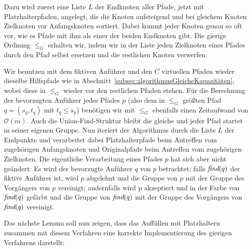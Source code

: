 Dazu wird zuerst eine Liste $L$ der Endknoten aller Pfade, jetzt mit Platzhalterpfaden, angelegt, die die Knoten
aufsteigend und bei gleichem Knoten Zielknoten vor Anfangsknoten sortiert.
Dabei kommt jeder Knoten genau so oft vor, wie es Pfade mit ihm als einer der beiden Endknoten gibt.
Die gierige Ordnung $\leq_{G}$ erhalten wir, indem wir in der Liste jeden Zielknoten eines Pfades durch den Pfad selbst
ersetzen und die restlichen Knoten verwerfen.

Wir benutzen mit dem fiktiven Anführer und den $C$ virtuellen Pfaden wieder dieselbe Hilfspfade wie in
Abschnitt~\ref{subsec:algorithmusGleicheKapazitäten}, wobei diese in $\leq_G$ wieder vor den restlichen Pfaden stehen.
Für die Berechnung der bevorzugten Anführer jedes Pfades $p$ (also dem in $\leq_G$ größten Pfad $q = (s_q, t_q)$ mit
$t_q \leq s_p$) benötigen wir mit $\leq_G$ ebenfalls einen Zeitaufwand von
$\mathcal O(m)$.
Auch die Union-Find-Struktur bleibt die gleiche und jeder Pfad startet in seiner eigenen Gruppe.
Nun iteriert der Algorithmus durch die Liste $L$ der Endpunkte und verarbeitet dabei Platzhalterpfade beim Antreffen vom
zugehörigen Anfangsknoten und Originalpfade beim Antreffen vom zugehörigen Zielknoten.
Die eigentliche Verarbeitung eines Pfades $p$ hat sich aber nicht geändert: Es wird der bevorzugte Anführer $q$ von $p$
betrachtet;
falls $\text{\em find}(q)$ der fiktive Anführer ist, wird $p$ abgelehnt und die Gruppe von $p$ mit der
Gruppe des Vorgängers von $p$ vereinigt;
andernfalls wird p akzeptiert und in der Farbe von $\text{\em find}(q)$
gefärbt und die Gruppe von $\text{\em find}(q)$ mit der Gruppe des Vorgängers von $\text{\em find}(q)$ vereinigt.

Das nächste Lemma soll nun zeigen, dass das Auffüllen mit Platzhaltern zusammen mit diesem Verfahren eine korrekte
Implementierung des gierigen Verfahrens darstellt:

